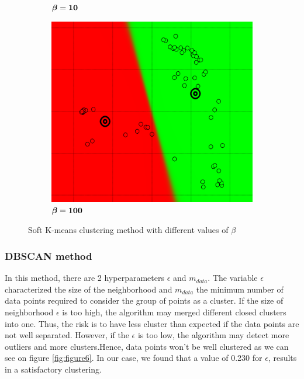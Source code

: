 \begin{figure}[!h]
\begin{subfigure}[h]{0.30\textwidth}
	\caption{$\boldsymbol \beta \bf = 10$}
    \end{subfigure}
    \begin{subfigure}[h]{0.30\textwidth}
    \centering
    \includegraphics[height=0.13\textheight]{./clustering/soft_k_mean_beta_100.png}
	\caption{$\boldsymbol \beta \bf = 100$}
    \end{subfigure}
\caption{Soft K-means clustering method with different values of $\beta$}
\label{fig:figure5}
\end{figure}

\subsubsection{DBSCAN method}
In this method, there are 2 hyperparameters $\epsilon$ and $m_{data}$. The variable $\epsilon$ characterized the size of the neighborhood and $m_{data}$ the minimum number of data points required to consider the group of points as a cluster. If the size of neighborhood $\epsilon$ is too high, the algorithm may merged different closed clusters into one. Thus, the risk is to have less cluster than expected if the data points are not well separated. However, if the $\epsilon$ is too low, the algorithm may detect more outliers and more clusters.Hence, data points won't be well clustered as we can see on figure \ref{fig:figure6}. In our case, we found that a value of 0.230 for $\epsilon$, results in a satisfactory clustering. 

